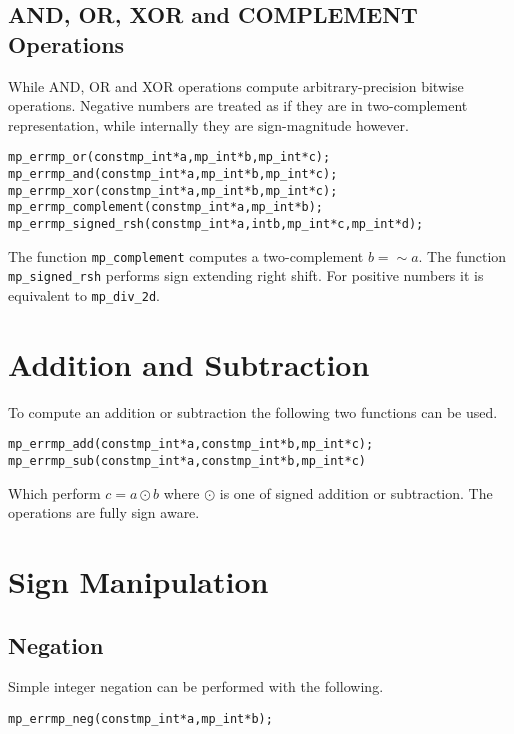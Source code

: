 \documentclass[synpaper]{book}
\begin{document}
\subsection{AND, OR, XOR and COMPLEMENT Operations}

While AND, OR and XOR operations compute arbitrary-precision bitwise operations. Negative numbers
are treated as if they are in two-complement representation, while internally they are sign-magnitude however.

   
\begin{alltt}
mp_err mp_or  (const mp_int *a, mp_int *b, mp_int *c);
mp_err mp_and (const mp_int *a, mp_int *b, mp_int *c);
mp_err mp_xor (const mp_int *a, mp_int *b, mp_int *c);
mp_err mp_complement(const mp_int *a, mp_int *b);
mp_err mp_signed_rsh(const mp_int *a, int b, mp_int *c, mp_int *d);
\end{alltt}

The function \texttt{mp\_complement} computes a two-complement $b = \sim a$. The function \texttt{mp\_signed\_rsh} performs
sign extending right shift. For positive numbers it is equivalent to \texttt{mp\_div\_2d}.

\section{Addition and Subtraction}

To compute an addition or subtraction the following two functions can be used.

 
\begin{alltt}
mp_err mp_add (const mp_int *a, const mp_int *b, mp_int *c);
mp_err mp_sub (const mp_int *a, const mp_int *b, mp_int *c)
\end{alltt}

Which perform $c = a \odot b$ where $\odot$ is one of signed addition or subtraction.  The operations are fully sign
aware.

\section{Sign Manipulation}
\subsection{Negation}
\label{sec:NEG}
Simple integer negation can be performed with the following.

\begin{alltt}
mp_err mp_neg (const mp_int *a, mp_int *b);
\end{alltt}
\end{document}
